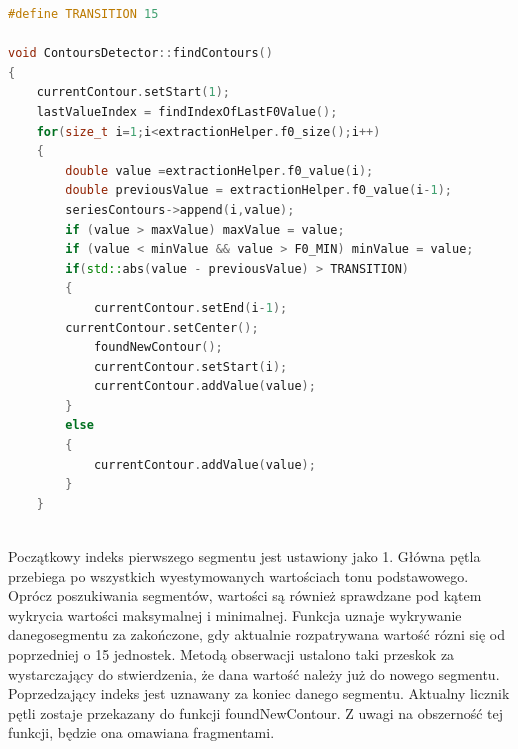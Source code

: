 \documentclass[a4paper,12 pt]{report}
\begin{document}
\newpage
\begin{lstlisting}[caption={Początkowa faza funkcji wykrywającej segmenty},label={lst:label},language=C++]
#define TRANSITION 15

void ContoursDetector::findContours()
{
    currentContour.setStart(1);
    lastValueIndex = findIndexOfLastF0Value();
    for(size_t i=1;i<extractionHelper.f0_size();i++)
    {
        double value =extractionHelper.f0_value(i);
        double previousValue = extractionHelper.f0_value(i-1); 
        seriesContours->append(i,value);
        if (value > maxValue) maxValue = value;
        if (value < minValue && value > F0_MIN) minValue = value;
        if(std::abs(value - previousValue) > TRANSITION)
        {
            currentContour.setEnd(i-1);
  	    currentContour.setCenter();    
            foundNewContour();
            currentContour.setStart(i);
            currentContour.addValue(value);
        }
        else
        {
            currentContour.addValue(value);
        }
    }
    
\end{lstlisting}
Początkowy indeks pierwszego segmentu jest ustawiony jako 1. Główna pętla przebiega po wszystkich wyestymowanych wartościach tonu podstawowego. Oprócz poszukiwania segmentów, wartości są również sprawdzane pod kątem wykrycia wartości maksymalnej i minimalnej. Funkcja uznaje wykrywanie danegosegmentu za zakończone, gdy aktualnie rozpatrywana wartość rózni się od poprzedniej o 15 jednostek. Metodą obserwacji ustalono taki przeskok za wystarczający do stwierdzenia, że dana wartość należy już do nowego segmentu. Poprzedzający indeks jest uznawany za koniec danego segmentu. Aktualny licznik pętli zostaje przekazany do funkcji foundNewContour. Z uwagi na obszerność tej funkcji, będzie ona omawiana fragmentami.
\end{document}

